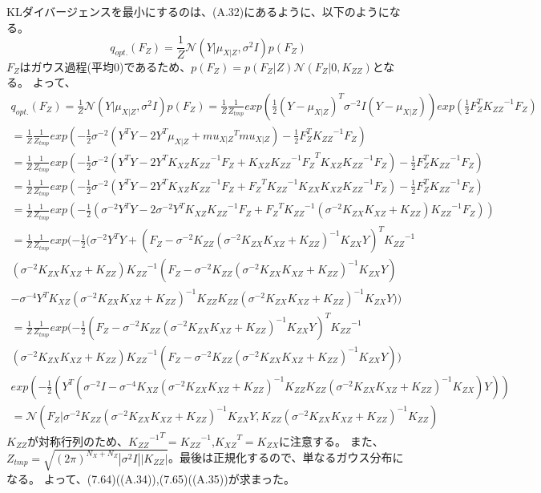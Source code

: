 \documentclass{jsarticle}
\begin{document}
KLダイバージェンスを最小にするのは、(A.32)にあるように、以下のようになる。
\begin{equation}
q_{opt.}(F_Z) = \frac{1}{Z}\mathcal{N}(Y | \mu_{X | Z}, \sigma^2 I)p(F_Z)
\end{equation}
$F_Z$はガウス過程(平均0)であるため、$p(F_Z) = p(F_Z | Z)\mathcal{N}(F_Z | 0, K_{ZZ})$となる。
よって、
\begin{equation}
\begin{split}
q_{opt.}(F_Z) = \frac{1}{Z}\mathcal{N}(Y | \mu_{X | Z}, \sigma^2 I)p(F_Z) 
= \frac{1}{Z}\frac{1}{Z_{tmp}}exp(\frac{1}{2}(Y - \mu_{X | Z})^T \sigma^{-2} I (Y - \mu_{X | Z})) exp(\frac{1}{2}F_Z^T {K_{ZZ}}^{-1} F_Z)\\
= \frac{1}{Z}\frac{1}{Z_{tmp}}exp(-\frac{1}{2}\sigma^{-2}(Y^T Y - 2 Y^T \mu_{X | Z} + {mu_{X | Z}}^T mu_{X | Z}) - \frac{1}{2}F_Z^T {K_{ZZ}}^{-1} F_Z)\\
= \frac{1}{Z}\frac{1}{Z_{tmp}}exp(-\frac{1}{2}\sigma^{-2}(Y^T Y - 2 Y^T K_{XZ}{K_{ZZ}}^{-1}F_Z + {K_{XZ}{K_{ZZ}}^{-1}F_Z}^T K_{XZ}{K_{ZZ}}^{-1}F_Z) - \frac{1}{2}F_Z^T {K_{ZZ}}^{-1} F_Z)\\
= \frac{1}{Z}\frac{1}{Z_{tmp}}exp(-\frac{1}{2}\sigma^{-2}(Y^T Y - 2 Y^T K_{XZ}{K_{ZZ}}^{-1}F_Z + {F_Z}^T {K_{ZZ}}^{-1} K_{ZX} K_{XZ}{K_{ZZ}}^{-1}F_Z) - \frac{1}{2}F_Z^T {K_{ZZ}}^{-1} F_Z)\\
= \frac{1}{Z}\frac{1}{Z_{tmp}}exp(-\frac{1}{2}(\sigma^{-2}Y^T Y - 2 \sigma^{-2} Y^T K_{XZ}{K_{ZZ}}^{-1}F_Z + {F_Z}^T {K_{ZZ}}^{-1} (\sigma^{-2} K_{ZX} K_{XZ} + K_{ZZ}) {K_{ZZ}}^{-1}F_Z))\\
= \frac{1}{Z}\frac{1}{Z_{tmp}}exp(-\frac{1}{2}(\sigma^{-2}Y^T Y 
+ ({F_Z} - \sigma^{-2} K_{ZZ}(\sigma^{-2} K_{ZX} K_{XZ} + K_{ZZ})^{-1}K_{ZX}Y)^T {K_{ZZ}}^{-1} \\(\sigma^{-2} K_{ZX} K_{XZ} + K_{ZZ}) {K_{ZZ}}^{-1}({F_Z} - \sigma^{-2} K_{ZZ}(\sigma^{-2} K_{ZX} K_{XZ} + K_{ZZ})^{-1}K_{ZX}Y)\\
- \sigma^{-4} Y^T K_{XZ} (\sigma^{-2} K_{ZX} K_{XZ} + K_{ZZ})^{-1} K_{ZZ} K_{ZZ}(\sigma^{-2} K_{ZX} K_{XZ} + K_{ZZ})^{-1}K_{ZX}Y))\\
= \frac{1}{Z}\frac{1}{Z_{tmp}}exp(-\frac{1}{2}({F_Z} - \sigma^{-2} K_{ZZ}(\sigma^{-2} K_{ZX} K_{XZ} + K_{ZZ})^{-1}K_{ZX}Y)^T {K_{ZZ}}^{-1} \\(\sigma^{-2} K_{ZX} K_{XZ} + K_{ZZ}) {K_{ZZ}}^{-1}({F_Z} - \sigma^{-2} K_{ZZ}(\sigma^{-2} K_{ZX} K_{XZ} + K_{ZZ})^{-1}K_{ZX}Y))\\
exp(-\frac{1}{2}(Y^T (\sigma^{-2} I - \sigma^{-4} K_{XZ} (\sigma^{-2} K_{ZX} K_{XZ} + K_{ZZ})^{-1} K_{ZZ} K_{ZZ}(\sigma^{-2} K_{ZX} K_{XZ} + K_{ZZ})^{-1}K_{ZX})Y))\\
= \mathcal{N}({F_Z} | \sigma^{-2} K_{ZZ}(\sigma^{-2} K_{ZX} K_{XZ} + K_{ZZ})^{-1}K_{ZX}Y, {K_{ZZ}} (\sigma^{-2} K_{ZX} K_{XZ} + K_{ZZ})^{-1} {K_{ZZ}})
\end{split}
\end{equation}
$K_{ZZ}$が対称行列のため、${{K_{ZZ}}^{-1}}^T = {K_{ZZ}}^{-1}$,${K_{XZ}}^T = K_{ZX}$に注意する。
また、$Z_{tmp} = \sqrt{(2\pi)^{N_X + N_Z}|\sigma^2 I||K_{ZZ}|}$。最後は正規化するので、単なるガウス分布になる。
よって、(7.64)((A.34)),(7.65)((A.35))が求まった。
\end{document}
